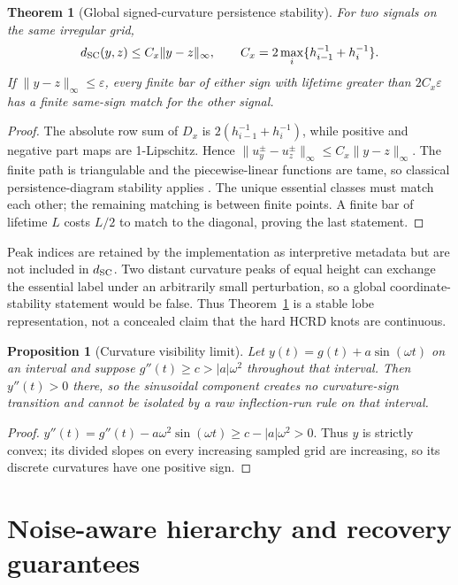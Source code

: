 \documentclass[review,onefignum,onetabnum]{siamonline250211}
\providecommand{\citep}[1]{\cite{#1}}
\newtheorem{theorem}{Theorem}
\newtheorem{proposition}{Proposition}
\begin{document}
\begin{theorem}[Global signed-curvature persistence stability]
\label{thm:persistence}
For two signals on the same irregular grid,
\begin{equation}
d_{\rm SC}(y,z)\le C_x\|y-z\|_\infty,
\qquad
C_x=2\max_i\{h_{i-1}^{-1}+h_i^{-1}\}.
\end{equation}
If $\|y-z\|_\infty\le\varepsilon$, every finite bar of either sign with
lifetime greater than $2C_x\varepsilon$ has a finite same-sign match for the
other signal.
\end{theorem}
\begin{proof}
The absolute row sum of $D_x$ is
$2(h_{i-1}^{-1}+h_i^{-1})$, while positive and negative part maps are
1-Lipschitz.  Hence
$\|u_y^\pm-u_z^\pm\|_\infty\le C_x\|y-z\|_\infty$.
The finite path is triangulable and the piecewise-linear functions are tame,
so classical persistence-diagram stability applies
\citep{cohensteiner2007stability}.  The unique essential classes must match
each other; the remaining matching is between finite points.  A finite bar of
lifetime $L$ costs $L/2$ to match to the diagonal, proving the last statement.
\end{proof}

Peak indices are retained by the implementation as interpretive metadata but
are not included in $d_{\rm SC}$.  Two distant curvature peaks of equal height
can exchange the essential label under an arbitrarily small perturbation, so a
global coordinate-stability statement would be false.  Thus
Theorem~\ref{thm:persistence} is a stable lobe representation, not a concealed
claim that the hard HCRD knots are continuous.

\begin{proposition}[Curvature visibility limit]
Let $y(t)=g(t)+a\sin(\omega t)$ on an interval and suppose
$g''(t)\ge c>|a|\omega^2$ throughout that interval.  Then $y''(t)>0$ there, so
the sinusoidal component creates no curvature-sign transition and cannot be
isolated by a raw inflection-run rule on that interval.
\end{proposition}
\begin{proof}
$y''(t)=g''(t)-a\omega^2\sin(\omega t)\ge c-|a|\omega^2>0$.
Thus $y$ is strictly convex; its divided slopes on every increasing sampled
grid are increasing, so its discrete curvatures have one positive sign.
\end{proof}

\fi
\section{Noise-aware hierarchy and recovery guarantees}
\end{document}
